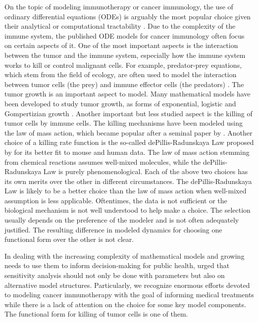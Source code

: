 \documentclass[review,authoryear]{elsarticle}
\begin{document}
On the topic of modeling immunotherapy or cancer immunology, the use of ordinary differential equations (ODEs) is arguably the most popular choice
given their analytical or computational tractability
\citep{Eftimie2010}. Due to the complexity of the immune system, the published ODE models for cancer immunology often focus on certain aspects of it. One of the most important
aspects is the interaction between the tumor and the immune system, especially
how the immune system works to kill or control malignant cells. For example, predator-prey equations, which stem from the field of ecology, are often used to model the interaction between tumor cells (the prey) and immune effector cells (the predators) \citep{Hamilton2022}. The tumor growth is an important aspect to model. Many mathematical
models have been developed to study tumor growth, as forms of exponential, logistic and Gompertizian
growth \citep{Murphy2016}. Another important but less studied aspect is the killing of tumor cells
by immune cells. The killing mechanisms have been modeled using
the law of mass action, which became popular after a seminal paper by \citet{KUZNETSOV1994}.
Another choice of a killing rate function is the so-called dePillis-Radunskaya
Law proposed by \citet{Pillis2005} for its better fit to mouse and human data. The law of mass action stemming from chemical reactions assumes well-mixed molecules, while the dePillis-Radunskaya
Law is purely phenomenological. Each of the above two choices has its own merits over the other in different circumstances. The dePillis-Radunskaya Law is likely to be a
better choice than the law of mass action when well-mixed
assumption is less applicable. Oftentimes, the data is not sufficient or the biological mechanism is not well understood to help make a choice. The selection usually depends on the preference
of the modeler and is not often adequately justified. The resulting difference in modeled dynamics for choosing one functional form over the other is not clear. 

In dealing with the increasing complexity of mathematical models and growing
needs to use them to inform decision-making for public health, \citet{Basu2013} urged that sensitivity analysis should
not only be done with parameters but also on alternative model structures. Particularly, we recognize enormous efforts devoted
to modeling cancer immunotherapy with the goal of informing medical treatments
while there is a lack of attention on the choice for some key
model components. The functional form for killing of tumor cells is one of them.
\end{document}
